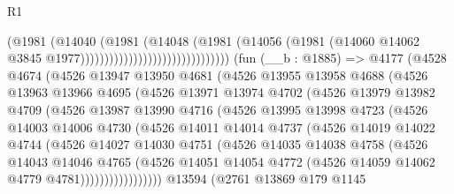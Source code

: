 \begin{lexlean}{R1}
\begin{coremodule}
                                                  (@1981
                                                    (@14040
                                                      (@1981
                                                        (@14048
                                                          (@1981
                                                            (@14056
                                                              (@1981
                                                                (@14060
                                                                  @14062
                                                                  @3845
                                                                  @1977)))))))))))))))))))))))))))))))
    (fun (__b : @1885) =>
    @4177
      (@4528
        @4674
        (@4526
          @13947
          @13950
          @4681
          (@4526
            @13955
            @13958
            @4688
            (@4526
              @13963
              @13966
              @4695
              (@4526
                @13971
                @13974
                @4702
                (@4526
                  @13979
                  @13982
                  @4709
                  (@4526
                    @13987
                    @13990
                    @4716
                    (@4526
                      @13995
                      @13998
                      @4723
                      (@4526
                        @14003
                        @14006
                        @4730
                        (@4526
                          @14011
                          @14014
                          @4737
                          (@4526
                            @14019
                            @14022
                            @4744
                            (@4526
                              @14027
                              @14030
                              @4751
                              (@4526
                                @14035
                                @14038
                                @4758
                                (@4526
                                  @14043
                                  @14046
                                  @4765
                                  (@4526
                                    @14051
                                    @14054
                                    @4772
                                    (@4526 @14059 @14062 @4779 @4781)))))))))))))))))
    @13594
    (@2761
      @13869
      @179
      @1145

\end{coremodule}
\end{lexlean}
